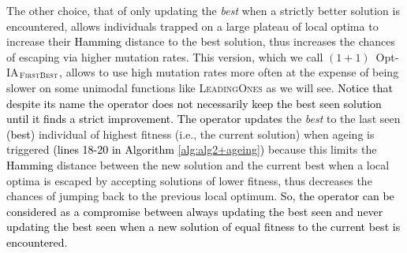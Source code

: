 \documentclass[lettersize,journal]{IEEEtran}
\newcommand{\rev}[1]{\textcolor{black}{#1}}
\newcommand{\rerev}[1]{\textcolor{black}{#1}}
\begin{document}
The other choice, that of only updating the {\it best} when a strictly better solution is encountered, allows individuals trapped on a large plateau of local optima to increase their \rev{Hamming} distance to the best solution, thus increases the chances of escaping via higher mutation rates. This version, which we call $(1+1)$~Opt-IA$_{\textsc{FirstBest}}$, allows to use high mutation rates more often at the expense of being slower on some unimodal functions like \textsc{LeadingOnes} as we will see. \rerev{Notice that despite its name the operator does not necessarily keep the best seen solution until it finds a strict improvement. The operator updates} the {\it best} to the last seen \rev{(best)} individual of highest fitness (i.e., the current solution) when ageing is triggered \rerev{(lines 18-20 in Algorithm \ref{alg:alg2+ageing})}  because this limits the \rev{Hamming} distance between the new solution and the current best when a local optima is escaped by accepting solutions of lower fitness, thus decreases the chances of jumping back to the previous local optimum.
\rerev{So, the operator can be considered as a compromise between always updating the best seen and never updating the best seen when a new solution of equal fitness to the current best is encountered.}  
 	
\end{document}
